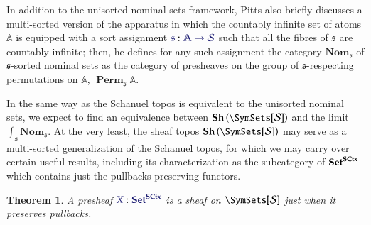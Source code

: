 \documentclass[11pt]{article}
\newtheorem{thm}{Theorem}[section]
\theoremstyle{definition}
\theoremstyle{remark}
\numberwithin{equation}{section}
\newcommand\Sheaves[1]{\mathbf{Sh}\left(#1\right)}
\newcommand\SCtxSite{\SymSets[\Sorts]}
\DeclareMathOperator{\Perm}{\mathbf{Perm}}
\begin{document}
In addition to the unisorted nominal sets framework, Pitts also briefly
discusses a multi-sorted version of the apparatus in which the countably
infinite set of atoms $\mathbb{A}$ is equipped with a sort assignment
$\Of{\mathfrak{s}}{\mathbb{A}\to\Sorts}$ such that all the fibres of
$\mathfrak{s}$ are countably infinite; then, he defines for any such assignment
the category $\mathbf{Nom}_\mathfrak{s}$ of $\mathfrak{s}$-sorted nominal sets
as the category of presheaves on the group of $\mathfrak{s}$-respecting
permutations on $\mathbb{A}$, $\Perm_\mathfrak{s}\mathbb{A}$.

In the same way as the Schanuel topos is equivalent to the unisorted nominal
sets, we expect to find an equivalence between $\Sheaves{\SCtxSite}$ and the
limit $\int_{\mathfrak{s}}\mathbf{Nom}_\mathfrak{s}$. At the very least,
the sheaf topos $\Sheaves{\SCtxSite}$ may serve as a multi-sorted
generalization of the Schanuel topos, for which we may carry over certain
useful results, including its characterization as the subcategory of
$\mathbf{Set}^{\mathbf{SCtx}}$ which contains just the pullbacks-preserving functors.

\begin{thm}
  A presheaf $\Of{X}{\Sets^{\SCtx}}$ is a sheaf on $\SCtxSite$ just when it
  preserves pullbacks.
\end{thm}
\end{document}
